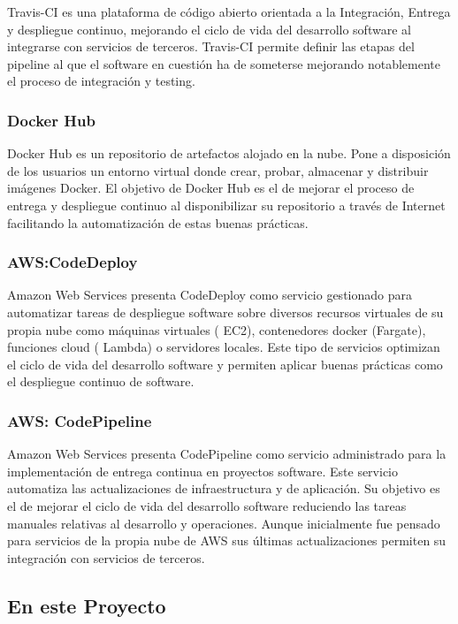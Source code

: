 \documentclass[a4paper,11pt]{book}
\begin{document}
Travis-CI\cite{travis} es una plataforma de código abierto orientada a la Integración, Entrega y despliegue continuo, mejorando el ciclo de vida del desarrollo software al integrarse con servicios de terceros. Travis-CI permite definir las etapas del pipeline al que el software en cuestión ha de someterse mejorando notablemente el proceso de integración y testing. 

\subsubsection{Docker Hub}

Docker Hub\cite{dhub} es un repositorio de artefactos alojado en la nube. Pone a disposición de los usuarios un entorno virtual donde crear, probar, almacenar y distribuir imágenes Docker. El objetivo de Docker Hub es el de mejorar el proceso de entrega y despliegue continuo al disponibilizar su repositorio a través de Internet facilitando la automatización de estas buenas prácticas. 

\subsubsection{AWS:CodeDeploy}

Amazon Web Services\cite{aws} presenta  CodeDeploy\cite{awscode} como servicio gestionado para automatizar tareas de despliegue software sobre diversos recursos virtuales de su propia nube como máquinas virtuales ( EC2), contenedores docker (Fargate), funciones cloud ( Lambda) o servidores locales. Este tipo de servicios optimizan el ciclo de vida del desarrollo software y permiten aplicar buenas prácticas como el despliegue continuo de software. 

\subsubsection{AWS: CodePipeline}
Amazon Web Services\cite{aws} presenta  CodePipeline\cite{awspipe} como servicio administrado para la implementación de entrega continua en proyectos software. Este servicio automatiza las actualizaciones de infraestructura y de aplicación. Su objetivo es el de mejorar el ciclo de vida del desarrollo software reduciendo las tareas manuales relativas al desarrollo y operaciones. Aunque inicialmente fue pensado para servicios de la propia nube de AWS sus últimas actualizaciones permiten su integración con servicios de terceros.  

\subsection{En este Proyecto}
\end{document}
